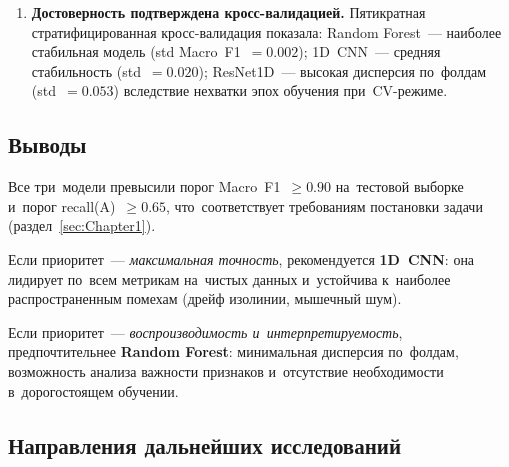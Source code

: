 \begin{enumerate}
\item \textbf{Достоверность подтверждена кросс-валидацией.}
Пятикратная стратифицированная кросс-валидация показала:
Random Forest~--- наиболее стабильная модель
(std Macro~F1~$= 0.002$); 1D~CNN~--- средняя стабильность
(std~$= 0.020$); ResNet1D~--- высокая дисперсия по~фолдам
(std~$= 0.053$) вследствие нехватки эпох обучения
при~CV-режиме.

\end{enumerate}

\subsection*{Выводы}

Все три~модели превысили порог Macro~F1~$\geq 0.90$
на~тестовой выборке и~порог recall(A)~$\geq 0.65$,
что~соответствует требованиям постановки задачи
(раздел~\ref{sec:Chapter1}).

Если приоритет~--- \textit{максимальная точность},
рекомендуется \textbf{1D~CNN}:
она лидирует по~всем метрикам на~чистых данных
и~устойчива к~наиболее распространенным помехам
(дрейф изолинии, мышечный шум).

Если приоритет~--- \textit{воспроизводимость и~интерпретируемость},
предпочтительнее \textbf{Random Forest}:
минимальная дисперсия по~фолдам, возможность анализа
важности признаков и~отсутствие необходимости
в~дорогостоящем обучении.

\subsection*{Направления дальнейших исследований}

